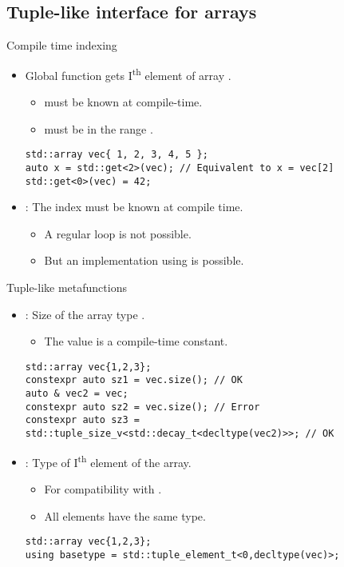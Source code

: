 \subsection{Tuple-like interface for arrays}

\begin{frame}[t,fragile]{Compile time indexing}
\begin{itemize}
  \item Global function  gets 
        I\textsuperscript{th} element of array .
    \begin{itemize}
      \item {} must be known at compile-time.
      \item {} must be in the range \cppid{[0,N)}.
    \end{itemize}
\begin{lstlisting}
std::array vec{ 1, 2, 3, 4, 5 };
auto x = std::get<2>(vec); // Equivalent to x = vec[2]
std::get<0>(vec) = 42;
\end{lstlisting}

  \item {}: The index must be known at compile time.
    \begin{itemize}
      \item A regular loop is not possible.
      \item But an implementation using  is possible.
    \end{itemize}

\end{itemize}
\end{frame}

\begin{frame}[t,fragile]{Tuple-like metafunctions}
\begin{itemize}
  \item {}: Size of the array type .
    \begin{itemize}
      \item The value is a compile-time constant.
    \end{itemize}
\begin{lstlisting}
std::array vec{1,2,3};
constexpr auto sz1 = vec.size(); // OK
auto & vec2 = vec;
constexpr auto sz2 = vec.size(); // Error
constexpr auto sz3 = std::tuple_size_v<std::decay_t<decltype(vec2)>>; // OK
\end{lstlisting}

  \item {}: Type of I\textsuperscript{th}
        element of the array.
    \begin{itemize}
      \item For compatibility with .
      \item All elements have the same type.
    \end{itemize}
\begin{lstlisting}
std::array vec{1,2,3};
using basetype = std::tuple_element_t<0,decltype(vec)>;
\end{lstlisting}
\end{itemize}
\end{frame}
